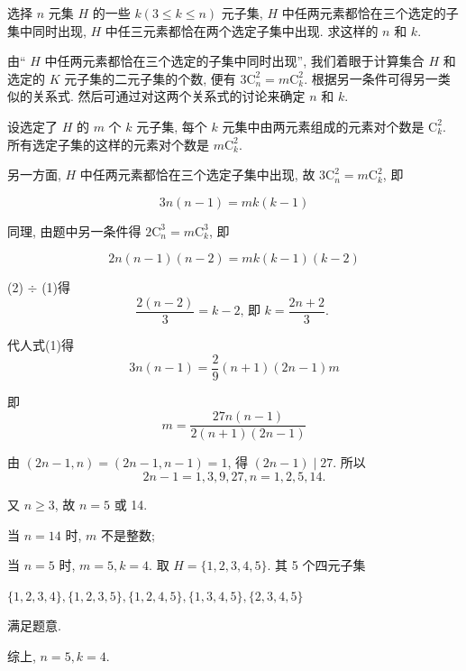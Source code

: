 \begin{example}
	选择 $n$ 元集 $H$ 的一些 $k(3 \leqslant k \leqslant n)$ 元子集, $H$ 中任两元素都恰在三个选定的子集中同时出现, $H$ 中任三元素都恰在两个选定子集中出现. 求这样的 $n$ 和 $k$.
\end{example}

\begin{analysis}
	由“ $H$ 中任两元素都恰在三个选定的子集中同时出现”, 我们着眼于计算集合 $H$ 和选定的 $K$ 元子集的二元子集的个数, 便有 $3 \mathrm{C}_{n}^{2}=m \mathrm{C}_{k}^{2}$. 根据另一条件可得另一类似的关系式. 然后可通过对这两个关系式的讨论来确定 $n$ 和 $k$.
\end{analysis}

\begin{solution}
	设选定了 $H$ 的 $m$ 个 $k$ 元子集, 每个 $k$ 元集中由两元素组成的元素对个数是 $\mathrm{C}_{k}^{2}$. 所有选定子集的这样的元素对个数是 $m \mathrm{C}_{k}^{2}$.

	另一方面, $H$ 中任两元素都恰在三个选定子集中出现, 故 $3 \mathrm{C}_{n}^{2}=m \mathrm{C}_{k}^{2}$, 即


	\begin{equation*}
		3 n(n-1)=m k(k-1) \tag{1}
	\end{equation*}


	同理, 由题中另一条件得 $2 \mathrm{C}_{n}^{3}=m \mathrm{C}_{k}^{3}$, 即


	\begin{equation*}
		2 n(n-1)(n-2)=m k(k-1)(k-2) \tag{2}
	\end{equation*}


	(2) $\div$ (1)得
	$$
		\frac{2(n-2)}{3}=k-2 \text {, 即 } k=\frac{2 n+2}{3} \text {. }
	$$

	代人式(1)得
	$$
		3 n(n-1)=\frac{2}{9}(n+1)(2 n-1) m
	$$

	即
	$$
		m=\frac{27 n(n-1)}{2(n+1)(2 n-1)}
	$$

	由 $(2 n-1, n)=(2 n-1, n-1)=1$, 得 $(2 n-1) \mid 27$. 所以
	$$
		2 n-1=1,3,9,27, n=1,2,5,14 .
	$$

	又 $n \geqslant 3$, 故 $n=5$ 或 14.

	当 $n=14$ 时, $m$ 不是整数;

	当 $n=5$ 时, $m=5, k=4$. 取 $H=\{1,2,3,4,5\}$. 其 5 个四元子集

	$\{1,2,3,4\},\{1,2,3,5\},\{1,2,4,5\},\{1,3,4,5\},\{2,3,4,5\}$

	满足题意.

	综上, $n=5, k=4$.
\end{solution}

